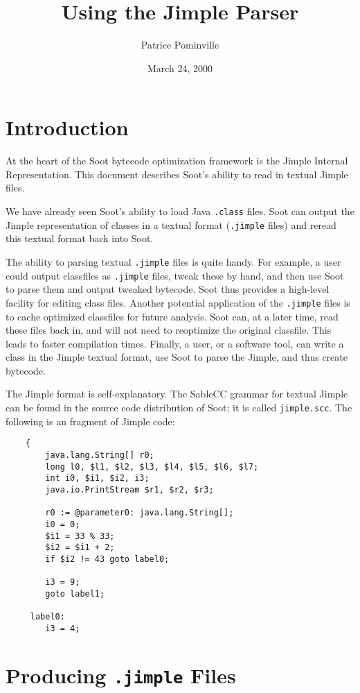 \documentclass[11pt]{article}
\title{Using the Jimple Parser}
\author{Patrice Pominville\\ \htmladdnormallink{patrice@sable.mcgill.ca}{mailto:patrice@sable.mcgill.ca}}
\date{March 24, 2000}
\begin{document}
\maketitle

\section{Introduction}
At the heart of the Soot bytecode optimization framework is the Jimple
Internal Representation.  This document describes Soot's ability to
read in textual Jimple files.

We have already seen Soot's ability to load Java {\tt .class} files.
Soot can output the Jimple representation of classes in a textual
format ({\tt .jimple} files) and reread this textual format back into
Soot.  

The ability to parsing textual {\tt .jimple} files is quite handy. For
example, a user could output classfiles as {\tt .jimple} files, tweak
these by hand, and then use Soot to parse them and output tweaked
bytecode.  Soot thus provides a high-level facility for editing class
files.  Another potential application of the {\tt .jimple} files is to
cache optimized classfiles for future analysis. Soot can, at a
later time, read these files back in, and will not need to reoptimize
the original classfile.  This leads to faster compilation times.
Finally, a user, or a software tool, can write a class in the Jimple
textual format, use Soot to parse the Jimple, and thus create bytecode. 


The Jimple format is self-explanatory. The SableCC grammar for textual
Jimple can be found in the source code distribution of Soot; it is called
{\tt jimple.scc}. The following is an fragment of Jimple code:

\begin{verbatim}
    {
        java.lang.String[] r0;
        long l0, $l1, $l2, $l3, $l4, $l5, $l6, $l7;
        int i0, $i1, $i2, i3;
        java.io.PrintStream $r1, $r2, $r3;

        r0 := @parameter0: java.lang.String[];
        i0 = 0;
        $i1 = 33 % 33;
        $i2 = $i1 + 2;
        if $i2 != 43 goto label0;

        i3 = 9;
        goto label1;

     label0:
        i3 = 4;
\end{verbatim}

\section{Producing {\tt .jimple} Files}
\end{document}
